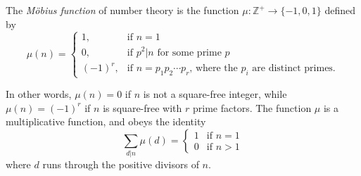 \documentclass[12pt]{article}
\begin{document}
The {\em M\"obius function} of number theory is the function $\mu:\mathbb{Z}^+\to\{-1,0,1\}$ defined by
\[
\mu (n) = 
\begin{cases}
1, &\text{if $n=1$}\\
0, &\text{if $p^2 | n$ for some prime $p$} \\
(-1)^r, &\text{if $n = p_1 p_2 \cdots p_r$, where the $p_i$ are distinct primes.}
\end{cases}
\]

In other words, $\mu (n) = 0$ if $n$ is not a square-free integer, while $\mu (n) = (-1)^r$ if $n$ is square-free with $r$ prime factors. The function $\mu$ is a multiplicative function, and obeys the identity
\[
\sum_{d | n} \mu(d) = 
\begin{cases}
1 & \text{if $n = 1$}\\
0 & \text{if $n > 1$}
\end{cases}
\]
where $d$ runs through the positive divisors of $n$.
\end{document}
